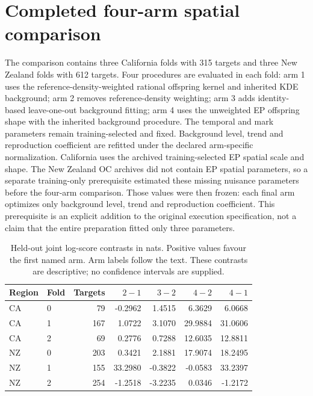 \section{Completed four-arm spatial comparison}

\label{sec:s03-completed}

The comparison contains three California folds with 315 targets and three New Zealand folds with 612 targets. Four procedures are evaluated in each fold: arm 1 uses the reference-density-weighted rational offspring kernel and inherited KDE background; arm 2 removes reference-density weighting; arm 3 adds identity-based leave-one-out background fitting; arm 4 uses the unweighted EP offspring shape with the inherited background procedure. The temporal and mark parameters remain training-selected and fixed. Background level, trend and reproduction coefficient are refitted under the declared arm-specific normalization. California uses the archived training-selected EP spatial scale and shape. The New Zealand OC archives did not contain EP spatial parameters, so a separate training-only prerequisite estimated these missing nuisance parameters before the four-arm comparison. Those values were then frozen: each final arm optimizes only background level, trend and reproduction coefficient. This prerequisite is an explicit addition to the original execution specification, not a claim that the entire preparation fitted only three parameters.

\begin{table}[htbp]\centering

\caption{Held-out joint log-score contrasts in nats. Positive values favour the first named arm. Arm labels follow the text. These contrasts are descriptive; no confidence intervals are supplied.}\label{tab:s03-completed}

\begin{tabular}{llrrrrr}\toprule Region & Fold & Targets & $2-1$ & $3-2$ & $4-2$ & $4-1$\\\midrule

CA & 0 & 79 & -0.2962 & 1.4515 & 6.3629 & 6.0668 \\

CA & 1 & 167 & 1.0722 & 3.1070 & 29.9884 & 31.0606 \\

CA & 2 & 69 & 0.2776 & 0.7288 & 12.6035 & 12.8811 \\

NZ & 0 & 203 & 0.3421 & 2.1881 & 17.9074 & 18.2495 \\

NZ & 1 & 155 & 33.2980 & -0.3822 & -0.0583 & 33.2397 \\

NZ & 2 & 254 & -1.2518 & -3.2235 & 0.0346 & -1.2172 \\

\bottomrule\end{tabular}\end{table}

